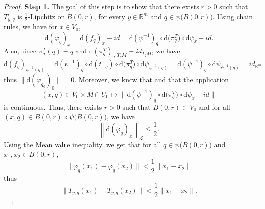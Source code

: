 \documentclass[11pt,reqno,a4paper]{article}%
\theoremstyle{definition}
\theoremstyle{remark}
\renewcommand{\leq}{\leqslant}
\newcommand{\opnorm}[1]{{\left\| #1 \right\|}_{\mathcal{L}}}
\renewcommand{\d}{\mathrm{d}}
\newcommand{\R}{\mathbb{R}}
\renewcommand{\d}{\mathrm{d}}
\begin{document}
\begin{proof}
    \noindent \textbf{Step 1.} The goal of this step is to show that there exists $r > 0$ such that $T_{y,q}$ is $\frac{1}{2}$-Lipchitz on $B(0,r)$, for every $y \in \R^m$ and $q \in \psi \big( B(0,r) \big)$.    
    Using chain rules, we have for $x \in V_0$,
    \[ \d (\varphi_{q})_{x} = \d ( f_{q})_{x} - id = \d (\psi^{-1})_{q} \circ \d \big( \pi_{q}^T\big) \circ \d \psi_{x} - id .  \]
    Also, since $ \pi_{q}^T(q) = q$ and $\d (\pi_{q}^T)_{q} |_{T_q M} = id_{T_{q}M}$, we have
    $$\d (f_{q})_{\psi^{-1}(q)} = \d (\psi^{-1})_{q}  \circ \d (t_{-q}) \circ \d \big( \pi_{q}^T\big) \circ \d \psi_{\psi^{-1}(q)} = \d (\psi^{-1})_{q} \circ \d \psi_{\psi^{-1}(q)} = id_{\R^m}$$
    thus $\| \d (\varphi_{q_0})_{0} \| = 0$.
    Moreover, we know that  and that the application 
    \[ (x,q) \in V_0 \times M \cap U_0 \mapsto  \| \d (\psi^{-1})_{q} \circ \d \big( \pi_{q}^T\big) \circ \d \psi_{x} - id  \| \]
    is continuous.
    Thus, there exists $r > 0$ such that $B(0,r) \subset V_0$ and for all $(x, q) \in B(0,r) \times \psi \big( B(0,r) \big)$, we have
    \begin{equation} \label{eq: maitrise_condition_projection}
        \opnorm{ \d ( \varphi_{q})_{x} }  \leq \frac{1}{2}.
    \end{equation}
    Using the Mean value inequality, we get that for all $q \in \psi \big( B(0,r) \big)$ and $ x_1,x_2 \in  B(0,r)$,
    $$ \| \varphi_{q}(x_1) - \varphi_{q}(x_2) \| < \frac{1}{2} \| x_1 - x_2\|$$
    thus $$ \|T_{y,q}(x_1) -T_{y,q}(x_2) \| < \frac{1}{2} \| x_1 - x_2\|.$$


\end{proof}
\end{document}
